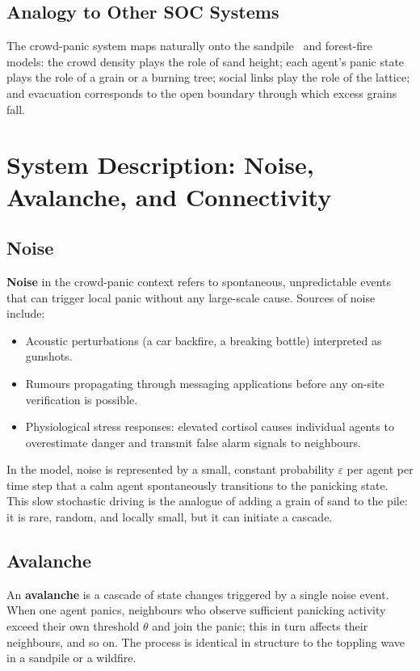 \documentclass[12pt, a4paper]{article}
\begin{document}
\subsection{Analogy to Other SOC Systems}

The crowd-panic system maps naturally onto the sandpile~\cite{bak1987} and forest-fire~\cite{drossel1992} models: the crowd density plays the role of sand height; each agent's panic state plays the role of a grain or a burning tree; social links play the role of the lattice; and evacuation corresponds to the open boundary through which excess grains fall.

\section{System Description: Noise, Avalanche, and Connectivity}
\label{sec:system}

\subsection{Noise}

\textbf{Noise} in the crowd-panic context refers to spontaneous, unpredictable
events that can trigger local panic without any large-scale cause.  Sources of
noise include:
\begin{itemize}
  \item Acoustic perturbations (a car backfire, a breaking bottle) interpreted as
        gunshots.
  \item Rumours propagating through messaging applications before any on-site
        verification is possible.
  \item Physiological stress responses: elevated cortisol causes individual agents
        to overestimate danger and transmit false alarm signals to neighbours.
\end{itemize}
In the model, noise is represented by a small, constant probability $\varepsilon$
per agent per time step that a calm agent spontaneously transitions to the panicking
state.  This slow stochastic driving is the analogue of adding a grain of sand to
the pile: it is rare, random, and locally small, but it can initiate a cascade.

\subsection{Avalanche}

An \textbf{avalanche} is a cascade of state changes triggered by a single noise
event.  When one agent panics, neighbours who observe sufficient panicking
activity exceed their own threshold $\theta$ and join the panic; this in turn
affects their neighbours, and so on.  The process is identical in structure to the
toppling wave in a sandpile or a wildfire.
\end{document}
